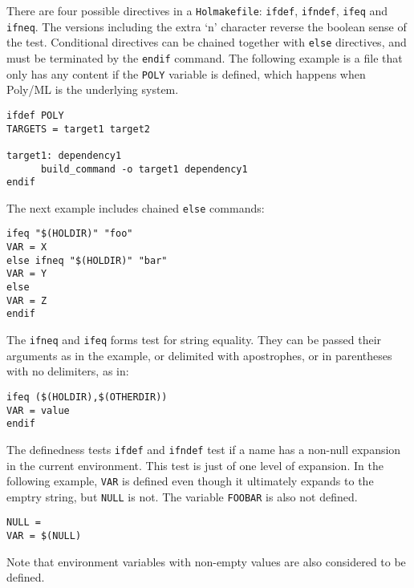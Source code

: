 There are four possible directives in a \texttt{Holmakefile}: \texttt{ifdef}, \texttt{ifndef}, \texttt{ifeq} and \texttt{ifneq}.
%
The versions including the extra `n' character reverse the boolean sense of the test.
%
Conditional directives can be chained together with \texttt{else} directives, and must be terminated by the \texttt{endif} command.
%
The following example is a file that only has any content if the \texttt{POLY} variable is defined, which happens when Poly/ML is the underlying \ML{} system.
\begin{hol}
\begin{verbatim}
ifdef POLY
TARGETS = target1 target2

target1: dependency1
      build_command -o target1 dependency1
endif
\end{verbatim}
\end{hol}
The next example includes chained \texttt{else} commands:
\begin{hol}
\begin{verbatim}
ifeq "$(HOLDIR)" "foo"
VAR = X
else ifneq "$(HOLDIR)" "bar"
VAR = Y
else
VAR = Z
endif
\end{verbatim}
\end{hol}
The \texttt{ifneq} and \texttt{ifeq} forms test for string equality.
%
They can be passed their arguments as in the example, or delimited with apostrophes, or in parentheses with no delimiters, as in:
\begin{hol}
\begin{verbatim}
ifeq ($(HOLDIR),$(OTHERDIR))
VAR = value
endif
\end{verbatim}
\end{hol}

The definedness tests \texttt{ifdef} and \texttt{ifndef} test if a name has a non-null expansion in the current environment.
%
This test is just of one level of expansion.
%
In the following example, \texttt{VAR} is defined even though it ultimately expands to the emptry string, but \texttt{NULL} is not.
%
The variable \texttt{FOOBAR} is also not defined.
\begin{hol}
\begin{verbatim}
NULL =
VAR = $(NULL)
\end{verbatim}
\end{hol}
Note that environment variables with non-empty values are also considered to be defined.

